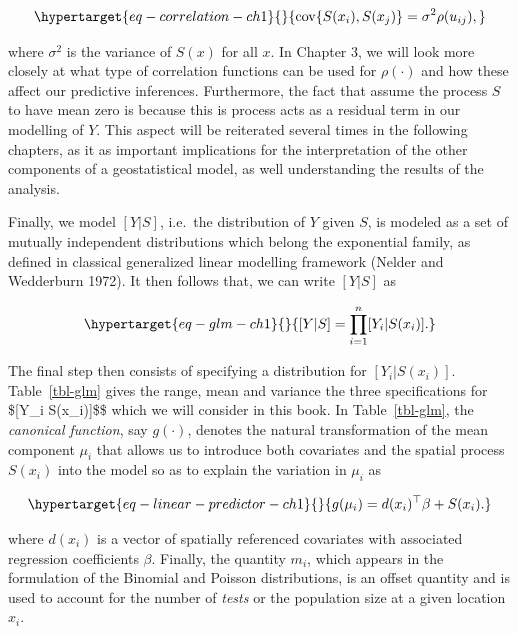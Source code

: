 \documentclass[
  letterpaper,
]{krantz}
\begin{document}
\begin{equation}\protect\hypertarget{eq-correlation-ch1}{}{
{\rm cov}\{S(x_i), S(x_j)\} = \sigma^2\rho(u_{ij}),
}\label{eq-correlation-ch1}\end{equation}

where \(\sigma^2\) is the variance of \(S(x)\) for all \(x\). In Chapter
3, we will look more closely at what type of correlation functions can
be used for \(\rho(\cdot)\) and how these affect our predictive
inferences. Furthermore, the fact that assume the process \(S\) to have
mean zero is because this is process acts as a residual term in our
modelling of \(Y\). This aspect will be reiterated several times in the
following chapters, as it as important implications for the
interpretation of the other components of a geostatistical model, as
well understanding the results of the analysis.

Finally, we model \([Y | S]\), i.e.~the distribution of \(Y\) given
\(S\), is modeled as a set of mutually independent distributions which
belong the exponential family, as defined in classical generalized
linear modelling framework (Nelder and Wedderburn 1972). It then follows
that, we can write \([Y | S]\) as

\begin{equation}\protect\hypertarget{eq-glm-ch1}{}{
[Y | S] = \prod_{i=1}^n [Y_i | S(x_i)].
}\label{eq-glm-ch1}\end{equation}

The final step then consists of specifying a distribution for
\([Y_i | S(x_i)]\). Table~\ref{tbl-glm} gives the range, mean and
variance the three specifications for \${[}Y\_i \textbar{}
S(x\_i){]}\$\$ which we will consider in this book. In
Table~\ref{tbl-glm}, the \emph{canonical function}, say \(g(\cdot)\),
denotes the natural transformation of the mean component \(\mu_i\) that
allows us to introduce both covariates and the spatial process
\(S(x_i)\) into the model so as to explain the variation in \(\mu_i\) as

\begin{equation}\protect\hypertarget{eq-linear-predictor-ch1}{}{
g(\mu_i) = d(x_i)^\top \beta + S(x_i).
}\label{eq-linear-predictor-ch1}\end{equation}

where \(d(x_i)\) is a vector of spatially referenced covariates with
associated regression coefficients \(\beta\). Finally, the quantity
\(m_i\), which appears in the formulation of the Binomial and Poisson
distributions, is an offset quantity and is used to account for the
number of \emph{tests} or the population size at a given location
\(x_i\).
\end{document}
